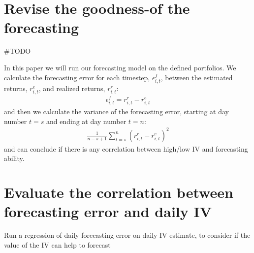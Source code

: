 \section*{Revise the goodness-of the forecasting}

#TODO 



In this paper we will run our forecasting model on the defined portfolios. We calculate the forecasting error for each timestep, $\epsilon_{i,t}^{f}$, between the estimated returns, $r_{i,t}^{e}$, and realized returns, $r_{i,t}^{r}$:
\begin{align}
    \epsilon_{i,t}^{f} = r_{i,t}^{r} - r_{i,t}^{e}
\end{align}
and then we calculate the variance of the forecasting error, starting at day number $t=s$ and ending at day number $t=n$:
\begin{align}
    \frac{1}{n-s+1}\sum_{t=s}^{n}(r_{i,t}^{r} - r_{i,t}^{e})^{2}
\end{align}
and can conclude if there is any correlation between high/low IV and forecasting ability.

\section*{Evaluate the correlation between forecasting error and daily IV} Run a regression of daily forecasting error on daily IV estimate, to consider if the value of the IV can help to forecast
